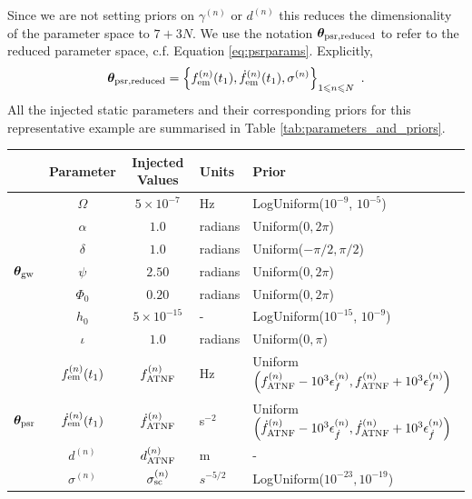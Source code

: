 \documentclass[fleqn,usenatbib,useAMS]{mnras}
\begin{document}
Since we are not setting priors on $\gamma^{(n)}$ or $d^{(n)}$ this reduces the dimensionality of the parameter space to $7 + 3N$. We use the notation $\boldsymbol{\theta}_{\rm psr, reduced}$ to refer to the reduced parameter space, c.f. Equation \ref{eq:psrparams}. Explicitly, 
\begin{equation}
	\boldsymbol{\theta}_{\rm psr, reduced} = \left \{ f_{\rm em}^{(n)}(t_1),\dot{f}_{\rm em}^{(n)}(t_1),\sigma^{(n)}\right\}_{1\leq n \leq N} \ .
\end{equation}
All the injected static parameters and their corresponding priors for this representative example are summarised in Table \ref{tab:parameters_and_priors}.
\begin{table}
	\centering
	\begin{tabular}{lccll}
		\toprule
		&Parameter & Injected Values & Units & Prior  \\
		\hline
		\multirow{7}{2mm}{$\boldsymbol{\theta}_{\rm gw}$} & $\Omega$       & $5 \times 10^{-7}$ & Hz & LogUniform($10^{-9}$, $10^{-5}$) \\
	  & $\alpha$          & $1.0$  & radians & Uniform($0, 2 \pi $)\\
	  & $\delta$              & $1.0$  & radians & Uniform($-\pi/2, \pi/2$) \\
	  & $\psi$              & $2.50$ & radians & Uniform($0, 2 \pi $) \\
	  & $\Phi_0$          & $0.20$ & radians & Uniform($0, 2 \pi $) \\
	  & $h_0$            & $5 \times 10^{-15}$ & - & LogUniform($10^{-15}$, $10^{-9}$) \\
	  & $\iota$             & $1.0$ & radians & Uniform($0, \pi$) \\ 
		\hline
		\multirow{5}{2mm}{$\boldsymbol{\theta}_{\rm psr}$} & $f_{\rm em}^{(n)} (t_1)$       & $f_{\rm ATNF}^{(n)}$ & Hz & Uniform$\left( f_{\rm ATNF}^{(n)} - 10^3 \epsilon^{(n)}_{f}, f_{\rm ATNF}^{(n)} + 10^3 \epsilon^{(n)}_{f} \right)$ \\
		& $\dot{f}_{\rm em}^{(n)} (t_1)$       & $\dot{f}_{\rm ATNF}^{(n)}$ & s$^{-2}$ & Uniform$\left( \dot{f}_{\rm ATNF}^{(n)} - 10^3 \epsilon^{(n)}_{\dot{f}}, \dot{f}_{\rm ATNF}^{(n)} + 10^3 \epsilon^{(n)}_{\dot{f}} \right)$ \\
		&  $d^{(n)}$       &$d_{\rm ATNF}^{(n)}$  & m & - \\
		& $\sigma^{(n)}$              & $\sigma_{\rm sc}^{(n)}$ & $s^{-5/2}$ & LogUniform($10^{-23}, 10^{-19}$) \\

\end{tabular}
\end{table}
\end{document}
